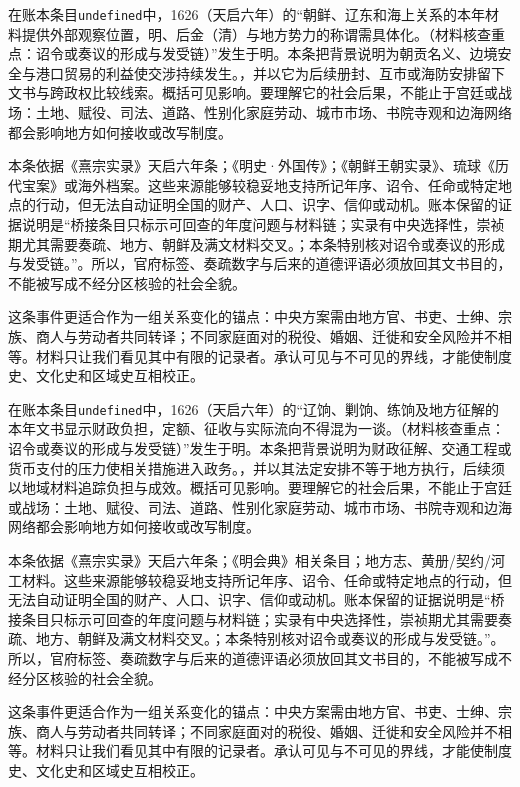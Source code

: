在账本条目\texttt{undefined}中，1626（天启六年）的“朝鲜、辽东和海上关系的本年材料提供外部观察位置，明、后金（清）与地方势力的称谓需具体化。（材料核查重点：诏令或奏议的形成与发受链）”发生于明。本条把背景说明为朝贡名义、边境安全与港口贸易的利益使交涉持续发生。，并以它为后续册封、互市或海防安排留下文书与跨政权比较线索。概括可见影响。要理解它的社会后果，不能止于宫廷或战场：土地、赋役、司法、道路、性别化家庭劳动、城市市场、书院寺观和边海网络都会影响地方如何接收或改写制度。

本条依据《熹宗实录》天启六年条；《明史·外国传》；《朝鲜王朝实录》、琉球《历代宝案》或海外档案。这些来源能够较稳妥地支持所记年序、诏令、任命或特定地点的行动，但无法自动证明全国的财产、人口、识字、信仰或动机。账本保留的证据说明是“桥接条目只标示可回查的年度问题与材料链；实录有中央选择性，崇祯期尤其需要奏疏、地方、朝鲜及满文材料交叉。；本条特别核对诏令或奏议的形成与发受链。”。所以，官府标签、奏疏数字与后来的道德评语必须放回其文书目的，不能被写成不经分区核验的社会全貌。

这条事件更适合作为一组关系变化的锚点：中央方案需由地方官、书吏、士绅、宗族、商人与劳动者共同转译；不同家庭面对的税役、婚姻、迁徙和安全风险并不相等。材料只让我们看见其中有限的记录者。承认可见与不可见的界线，才能使制度史、文化史和区域史互相校正。

在账本条目\texttt{undefined}中，1626（天启六年）的“辽饷、剿饷、练饷及地方征解的本年文书显示财政负担，定额、征收与实际流向不得混为一谈。（材料核查重点：诏令或奏议的形成与发受链）”发生于明。本条把背景说明为财政征解、交通工程或货币支付的压力使相关措施进入政务。，并以其法定安排不等于地方执行，后续须以地域材料追踪负担与成效。概括可见影响。要理解它的社会后果，不能止于宫廷或战场：土地、赋役、司法、道路、性别化家庭劳动、城市市场、书院寺观和边海网络都会影响地方如何接收或改写制度。

本条依据《熹宗实录》天启六年条；《明会典》相关条目；地方志、黄册/契约/河工材料。这些来源能够较稳妥地支持所记年序、诏令、任命或特定地点的行动，但无法自动证明全国的财产、人口、识字、信仰或动机。账本保留的证据说明是“桥接条目只标示可回查的年度问题与材料链；实录有中央选择性，崇祯期尤其需要奏疏、地方、朝鲜及满文材料交叉。；本条特别核对诏令或奏议的形成与发受链。”。所以，官府标签、奏疏数字与后来的道德评语必须放回其文书目的，不能被写成不经分区核验的社会全貌。

这条事件更适合作为一组关系变化的锚点：中央方案需由地方官、书吏、士绅、宗族、商人与劳动者共同转译；不同家庭面对的税役、婚姻、迁徙和安全风险并不相等。材料只让我们看见其中有限的记录者。承认可见与不可见的界线，才能使制度史、文化史和区域史互相校正。

